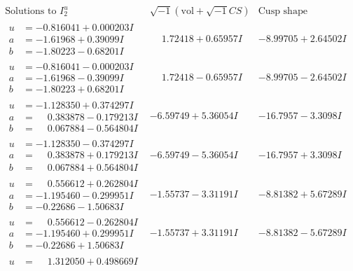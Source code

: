 \documentclass[1p]{elsarticle_modified}
\theoremstyle{definition}
\newcommand{\I}{\sqrt{-1}}
\begin{document}
$$\begin{array}{c|c|c}  
\text{Solutions to }I^u_{2}& \I (\text{vol} + \sqrt{-1}CS) & \text{Cusp shape}\\
 \hline 
\begin{aligned}
u &= -0.816041 + 0.000203 I \\
a &= -1.61968 + 0.39099 I \\
b &= -1.80223 - 0.68201 I\end{aligned}
 & \phantom{-}1.72418 + 0.65957 I & -8.99705 + 2.64502 I \\ \hline\begin{aligned}
u &= -0.816041 - 0.000203 I \\
a &= -1.61968 - 0.39099 I \\
b &= -1.80223 + 0.68201 I\end{aligned}
 & \phantom{-}1.72418 - 0.65957 I & -8.99705 - 2.64502 I \\ \hline\begin{aligned}
u &= -1.128350 + 0.374297 I \\
a &= \phantom{-}0.383878 - 0.179213 I \\
b &= \phantom{-}0.067884 - 0.564804 I\end{aligned}
 & -6.59749 + 5.36054 I & -16.7957 - 3.3098 I \\ \hline\begin{aligned}
u &= -1.128350 - 0.374297 I \\
a &= \phantom{-}0.383878 + 0.179213 I \\
b &= \phantom{-}0.067884 + 0.564804 I\end{aligned}
 & -6.59749 - 5.36054 I & -16.7957 + 3.3098 I \\ \hline\begin{aligned}
u &= \phantom{-}0.556612 + 0.262804 I \\
a &= -1.195460 - 0.299951 I \\
b &= -0.22686 - 1.50683 I\end{aligned}
 & -1.55737 - 3.31191 I & -8.81382 + 5.67289 I \\ \hline\begin{aligned}
u &= \phantom{-}0.556612 - 0.262804 I \\
a &= -1.195460 + 0.299951 I \\
b &= -0.22686 + 1.50683 I\end{aligned}
 & -1.55737 + 3.31191 I & -8.81382 - 5.67289 I \\ \hline\begin{aligned}
u &= \phantom{-}1.312050 + 0.498669 I \\

\end{aligned}
\end{array}$$
\end{document}
